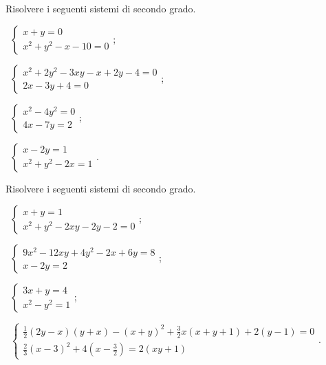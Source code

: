 \begin{esercizio}[\Ast]
\label{ese:6.6}
Risolvere i seguenti sistemi di secondo grado.
\begin{multicols}{2}
 \begin{enumeratea}
 \item~$\left\{\begin{array}{l}x+y=0\\x^2+y^2-x-10=0\end{array}\right.$;
 \item~$\left\{\begin{array}{l}x^2+2y^2-3xy-x+2y-4=0\\2x-3y+4=0\end{array}\right.$;
 \item~$\left\{\begin{array}{l}x^2-4y^2=0\\4x-7y=2\end{array}\right.$;
 \item~$\left\{\begin{array}{l}x-2y=1\\x^2+y^2-2x=1\end{array}\right.$.
 \end{enumeratea}
 \end{multicols}
\end{esercizio}
\newpage
\begin{esercizio}[\Ast]
 \label{ese:6.7}
Risolvere i seguenti sistemi di secondo grado.
 \begin{enumeratea}
 \item~$\left\{\begin{array}{l}x+y=1\\x^2+y^2-2xy-2y-2=0\end{array}\right.$;
 \item~$\left\{\begin{array}{l}9x^2-12xy+4y^2-2x+6y=8\\x-2y=2\end{array}\right.$;
 \item~$\left\{\begin{array}{l}3x+y=4\\x^2-y^2=1\end{array}\right.$;
 \item~$\left\{\begin{array}{l}\frac 1 2(2y-x)(y+x)-(x+y)^2+\frac 3 2x(x+y+1)+2(y-1)=0\\\frac 2 3(x-3)^2+4\left(x-\frac 3 2\right)=2({xy}+1)\end{array}\right.$.
 \end{enumeratea}
\end{esercizio}

